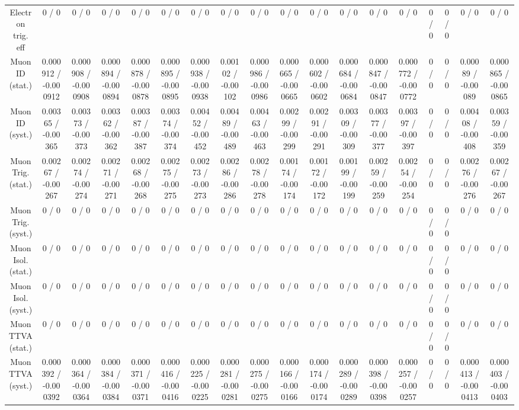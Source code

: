 \documentclass[10pt]{article}
\begin{document}
\begin{table}[htbp]
\begin{center}
\begin{tabular}{|c|c|c|c|c|c|c|c|c|c|c|c|c|c|c|c|c|c|}
  Electron trig. eff & 0 / 0 & 0 / 0 & 0 / 0 & 0 / 0 & 0 / 0 & 0 / 0 & 0 / 0 & 0 / 0 & 0 / 0 & 0 / 0 & 0 / 0 & 0 / 0 & 0 / 0 & 0 / 0 & 0 / 0 & 0 / 0 & 0 / 0 \\ 
  Muon ID (stat.) & 0.000912 / -0.000912 & 0.000908 / -0.000908 & 0.000894 / -0.000894 & 0.000878 / -0.000878 & 0.000895 / -0.000895 & 0.000938 / -0.000938 & 0.00102 / -0.00102 & 0.000986 / -0.000986 & 0.000665 / -0.000665 & 0.000602 / -0.000602 & 0.000684 / -0.000684 & 0.000847 / -0.000847 & 0.000772 / -0.000772 & 0 / 0 & 0 / 0 & 0.00089 / -0.00089 & 0.000865 / -0.000865 \\ 
  Muon ID (syst.) & 0.00365 / -0.00365 & 0.00373 / -0.00373 & 0.00362 / -0.00362 & 0.00387 / -0.00387 & 0.00374 / -0.00374 & 0.00452 / -0.00452 & 0.00489 / -0.00489 & 0.00463 / -0.00463 & 0.00299 / -0.00299 & 0.00291 / -0.00291 & 0.00309 / -0.00309 & 0.00377 / -0.00377 & 0.00397 / -0.00397 & 0 / 0 & 0 / 0 & 0.00408 / -0.00408 & 0.00359 / -0.00359 \\ 
  Muon Trig. (stat.) & 0.00267 / -0.00267 & 0.00274 / -0.00274 & 0.00271 / -0.00271 & 0.00268 / -0.00268 & 0.00275 / -0.00275 & 0.00273 / -0.00273 & 0.00286 / -0.00286 & 0.00278 / -0.00278 & 0.00174 / -0.00174 & 0.00172 / -0.00172 & 0.00199 / -0.00199 & 0.00259 / -0.00259 & 0.00254 / -0.00254 & 0 / 0 & 0 / 0 & 0.00276 / -0.00276 & 0.00267 / -0.00267 \\ 
  Muon Trig. (syst.) & 0 / 0 & 0 / 0 & 0 / 0 & 0 / 0 & 0 / 0 & 0 / 0 & 0 / 0 & 0 / 0 & 0 / 0 & 0 / 0 & 0 / 0 & 0 / 0 & 0 / 0 & 0 / 0 & 0 / 0 & 0 / 0 & 0 / 0 \\ 
  Muon Isol. (stat.) & 0 / 0 & 0 / 0 & 0 / 0 & 0 / 0 & 0 / 0 & 0 / 0 & 0 / 0 & 0 / 0 & 0 / 0 & 0 / 0 & 0 / 0 & 0 / 0 & 0 / 0 & 0 / 0 & 0 / 0 & 0 / 0 & 0 / 0 \\ 
  Muon Isol. (syst.) & 0 / 0 & 0 / 0 & 0 / 0 & 0 / 0 & 0 / 0 & 0 / 0 & 0 / 0 & 0 / 0 & 0 / 0 & 0 / 0 & 0 / 0 & 0 / 0 & 0 / 0 & 0 / 0 & 0 / 0 & 0 / 0 & 0 / 0 \\ 
  Muon TTVA (stat.) & 0 / 0 & 0 / 0 & 0 / 0 & 0 / 0 & 0 / 0 & 0 / 0 & 0 / 0 & 0 / 0 & 0 / 0 & 0 / 0 & 0 / 0 & 0 / 0 & 0 / 0 & 0 / 0 & 0 / 0 & 0 / 0 & 0 / 0 \\ 
  Muon TTVA (syst.) & 0.000392 / -0.000392 & 0.000364 / -0.000364 & 0.000384 / -0.000384 & 0.000371 / -0.000371 & 0.000416 / -0.000416 & 0.000225 / -0.000225 & 0.000281 / -0.000281 & 0.000275 / -0.000275 & 0.000166 / -0.000166 & 0.000174 / -0.000174 & 0.000289 / -0.000289 & 0.000398 / -0.000398 & 0.000257 / -0.000257 & 0 / 0 & 0 / 0 & 0.000413 / -0.000413 & 0.000403 / -0.000403 \\ 

\end{tabular}
\end{center}
\end{table}
\end{document}

